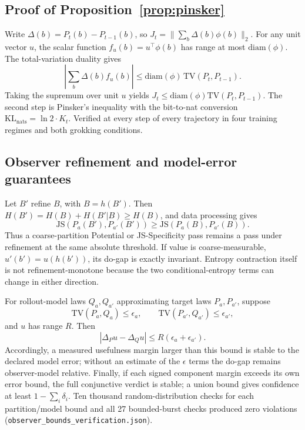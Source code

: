 \documentclass[11pt]{article}
\theoremstyle{definition}
\newcommand{\KL}{\mathrm{KL}}
\newcommand{\JS}{\mathrm{JS}}
\newcommand{\TV}{\mathrm{TV}}
\begin{document}
\subsection*{Proof of Proposition~\ref{prop:pinsker}}
Write $\Delta(b)=P_t(b)-P_{t-1}(b)$, so
$J_t=\lVert\sum_b \Delta(b)\phi(b)\rVert_2$. For any unit vector $u$,
the scalar function $f_u(b)=u^\top\phi(b)$ has range at most
$\mathrm{diam}(\phi)$. The total-variation duality gives
\[
  \left|\sum_b \Delta(b) f_u(b)\right|
  \le \mathrm{diam}(\phi)\,\TV(P_t,P_{t-1}).
\]
Taking the supremum over unit $u$ yields
$J_t \le \mathrm{diam}(\phi)\TV(P_t,P_{t-1})$. The second step is
Pinsker's inequality with the bit-to-nat conversion
$\KL_{\mathrm{nats}} = \ln 2 \cdot K_t$. Verified at every step of
every trajectory in four training regimes and both grokking
conditions.

\subsection*{Observer refinement and model-error guarantees}
Let $B'$ refine $B$, with $B=h(B')$. Then
$H(B')=H(B)+H(B'|B)\geq H(B)$, and data processing gives
\[
\JS(P_a(B'),P_{a'}(B')) \geq
\JS(P_a(B),P_{a'}(B)).
\]
Thus a coarse-partition Potential or JS-Specificity pass remains a pass
under refinement at the same absolute threshold. If value is
coarse-measurable, $u'(b')=u(h(b'))$, its do-gap is exactly invariant.
Entropy contraction itself is not refinement-monotone because the two
conditional-entropy terms can change in either direction.

For rollout-model laws $Q_a,Q_{a'}$ approximating target laws
$P_a,P_{a'}$, suppose
\[
\TV(P_a,Q_a)\leq\epsilon_a,\qquad
\TV(P_{a'},Q_{a'})\leq\epsilon_{a'},
\]
and $u$ has range $R$. Then
\[
\left|\Delta_P u-\Delta_Q u\right|
\leq R(\epsilon_a+\epsilon_{a'}).
\]
Accordingly, a measured usefulness margin larger than this bound is
stable to the declared model error; without an estimate of the
$\epsilon$ terms the do-gap remains observer-model relative. Finally,
if each signed component margin exceeds its own error bound, the full
conjunctive verdict is stable; a union bound gives confidence at least
$1-\sum_i\delta_i$. Ten thousand random-distribution checks for each
partition/model bound and all 27 bounded-burst checks produced zero
violations (\texttt{observer\_bounds\_verification.json}).
\end{document}
